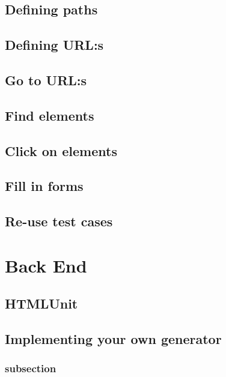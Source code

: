 \documentclass[a4paper,11pt]{kth-mag}
\begin{document}
\section{Defining paths}

\section{Defining URL:s}

\section{Go to URL:s}



\section{Find elements}




\section{Click on elements}


\section{Fill in forms}







\section{Re-use test cases}

\chapter{Back End}

\section{HTMLUnit}


\section{Implementing your own generator}
\label{backendimpl}

\subsection{subsection}
\end{document}
